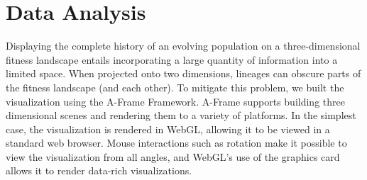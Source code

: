 \documentclass[letterpaper]{article}
\begin{document}
\section{Data Analysis}




Displaying the complete history of an evolving population on a three-dimensional fitness landscape entails incorporating a large quantity of information into a limited space. When projected onto two dimensions, lineages can obscure parts of the fitness landscape (and each other). To mitigate this problem, we built the visualization using the A-Frame Framework. A-Frame supports building three dimensional scenes and rendering them to a variety of platforms. In the simplest case, the visualization is rendered in WebGL, allowing it to be viewed in a standard web browser. Mouse interactions such as rotation make it possible to view the visualization from all angles, and WebGL's use of the graphics card allows it to render data-rich visualizations. 
\end{document}
